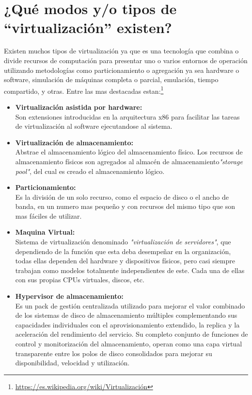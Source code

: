 \section{¿Qué modos y/o tipos de “virtualización” existen?}
Existen muchos tipos de virtualización ya que  es una tecnología que combina o divide
recursos de computación para presentar uno o varios
entornos de operación utilizando metodologías como
particionamiento o agregación ya sea hardware o software,
simulación de máquinas completa o parcial, emulación,
tiempo compartido, y otras. Entre las mas destacadas estan:\footnote{\url{https://es.wikipedia.org/wiki/Virtualización}} 
\begin{itemize}
\item \textbf{Virtualización asistida por hardware:} 
\\Son extensiones introducidas en la arquitectura x86 para facilitar las tareas de virtualización al software ejecutandose al sistema.
\item \textbf{Virtualización de almacenamiento:}
\\Abstrae el almacenamiento lógico del almacenamiento físico. Los recursos de almacenamiento físicos son agregados al almacén de almacenamiento\textit{"storage pool"}, del cual es creado el almacenamiento lógico.
\item \textbf{Particionamiento:}
\\Es la división de un solo recurso, como el espacio de disco o el ancho de banda, en un numero mas pequeño y con recursos del mismo tipo que son mas fáciles de utilizar.
\item \textbf{Maquina Virtual:}
\\ Sistema de virtualización denominado \textit{"virtualización de servidores"}, que dependiendo de la función que esta deba desempeñar en la organización, todas ellas dependen del hardware y dispositivos físicos, pero casi siempre trabajan como modelos totalmente independientes de este. Cada una de ellas con sus propias CPUs virtuales, discos, etc.
\item \textbf{Hypervisor de almacenamiento:}
\\Es un pack de gestión centralizada utilizado para mejorar el valor combinado de los sistemas de disco de almacenamiento múltiples complementando sus capacidades individuales con el aprovisionamiento extendido, la replica y la aceleración del rendimiento del servicio. Su completo conjunto de funciones de control y monitorización del almacenamiento, operan como una capa virtual transparente entre los polos de disco consolidados para mejorar su disponibilidad, velocidad y utilización.

\end{itemize}
\newpage
